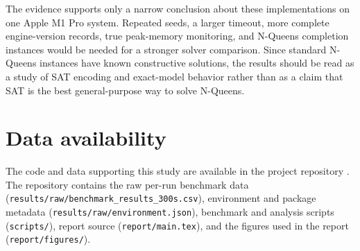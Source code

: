 \documentclass[a4paper,fleqn]{cas-sc}
\begin{document}
The evidence supports only a narrow conclusion about these implementations on one Apple M1 Pro system. Repeated seeds, a larger timeout, more complete engine-version records, true peak-memory monitoring, and N-Queens completion instances would be needed for a stronger solver comparison. Since standard N-Queens instances have known constructive solutions, the results should be read as a study of SAT encoding and exact-model behavior rather than as a claim that SAT is the best general-purpose way to solve N-Queens.

\section*{Data availability}
The code and data supporting this study are available in the project repository \cite{NguyenMinhKhiemNQueens2026}. The repository contains the raw per-run benchmark data (\texttt{results/raw/benchmark\_results\_300s.csv}), environment and package metadata (\texttt{results/raw/environment.json}), benchmark and analysis scripts (\texttt{scripts/}), report source (\texttt{report/main.tex}), and the figures used in the report (\texttt{report/figures/}).



\end{document}
